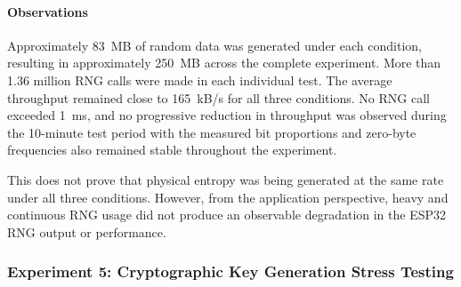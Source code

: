 \documentclass[a4paper, 12pt]{article}
\begin{document}
\begin{table}[htbp]
    \centering
    \caption{Results of the 10-minute sustained RNG stress test}
    \label{tab:rng_stress_results}
\end{table}

\paragraph{Observations}
Approximately 83~MB of random data was generated under each condition,
resulting in approximately 250~MB across the complete experiment. More than
1.36 million RNG calls were made in each individual test. The average throughput remained close to 165~kB/s for all three conditions.
No RNG call exceeded 1~ms, and no progressive reduction in throughput was
observed during the 10-minute test period with the measured bit proportions and
zero-byte frequencies also remained stable throughout the experiment.

This does not prove that physical entropy was being generated at the same rate
under all three conditions. However, from the application perspective, heavy
and continuous RNG usage did not produce an observable degradation in the
ESP32 RNG output or performance.


\subsubsection{Experiment 5: Cryptographic Key Generation Stress Testing}
\end{document}
